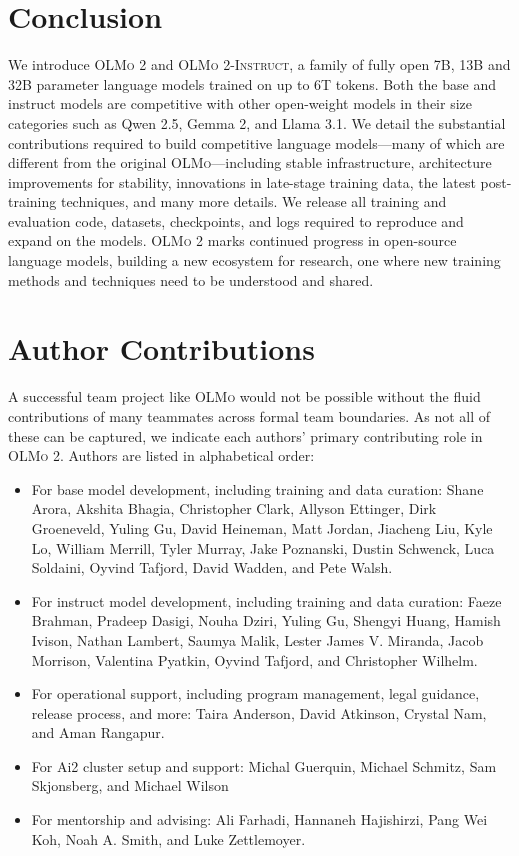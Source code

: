 \documentclass[table]{ai2style/ai2}
\newcommand{\olmo}{\textsc{OLMo}\xspace}
\newcommand{\olmotoo}{\textsc{OLMo 2}\xspace}
\newcommand{\olmotooinstruct}{\textsc{OLMo 2-Instruct}\xspace}
\begin{document}
\section*{Conclusion}
We introduce \olmotoo and \olmotooinstruct, a family of fully open 7B, 13B and 32B parameter language models trained on up to 6T tokens.
Both the base and instruct models are competitive with other open-weight models in their size categories such as Qwen 2.5, Gemma 2, and Llama 3.1.
We detail the substantial contributions required to build competitive language models---many of which are different from the original \olmo---including stable infrastructure, architecture improvements for stability, innovations in late-stage training data, the latest post-training techniques, and many more details.
We release all training and evaluation code, datasets, checkpoints, and logs required to reproduce and expand on the models.
\olmotoo marks continued progress in open-source language models, building a new ecosystem for research, one where new training methods and techniques need to be understood and shared.

\section*{Author Contributions}
\label{sec:contrib}

A successful team project like \olmo{} would not be possible without the fluid contributions of many teammates across formal team boundaries. 
As not all of these can be captured, we indicate each authors' primary contributing role in \olmotoo.
Authors are listed in alphabetical order: 

\begin{itemize}
    \item For base model development, including training and data curation: Shane Arora, Akshita Bhagia, Christopher Clark, Allyson Ettinger, Dirk Groeneveld, Yuling Gu, David Heineman, Matt Jordan, Jiacheng Liu, Kyle Lo, William Merrill, Tyler Murray, Jake Poznanski, Dustin Schwenck, Luca Soldaini, Oyvind Tafjord, David Wadden, and Pete Walsh.

    \item For instruct model development, including training and data curation: Faeze Brahman, Pradeep Dasigi, Nouha Dziri, Yuling Gu, Shengyi Huang, Hamish Ivison, Nathan Lambert, Saumya Malik, Lester James V. Miranda, Jacob Morrison, Valentina Pyatkin, Oyvind Tafjord, and Christopher Wilhelm.

    \item For operational support, including program management, legal guidance, release process, and more: Taira Anderson, David Atkinson, Crystal Nam, and Aman Rangapur.

    \item For Ai2 cluster setup and support: Michal Guerquin, Michael Schmitz, Sam Skjonsberg, and Michael Wilson

    \item For mentorship and advising: Ali Farhadi, Hannaneh Hajishirzi, Pang Wei Koh, Noah A. Smith, and Luke Zettlemoyer.
\end{itemize}
\end{document}
